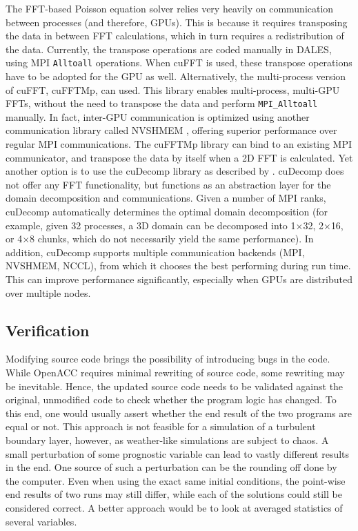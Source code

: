 The FFT-based Poisson equation solver relies very heavily on communication between processes (and therefore, GPUs). This is because it requires transposing the data in between FFT calculations, which in turn requires a redistribution of the data. Currently, the transpose operations are coded manually in DALES, using MPI \texttt{Alltoall} operations. When cuFFT is used, these transpose operations have to be adopted for the GPU as well. Alternatively, the multi-process version of cuFFT, cuFFTMp, can used. This library enables multi-process, multi-GPU FFTs, without the need to transpose the data and perform \texttt{MPI\_Alltoall} manually. In fact, inter-GPU communication is optimized using another communication library called NVSHMEM \citep{nvidiadeveloperNVSHMEM}, offering superior performance over regular MPI communications. The cuFFTMp library can bind to an existing MPI communicator, and transpose the data by itself when a 2D FFT is calculated. Yet another option is to use the cuDecomp library as described by \citet{romeroDistributedmemorySimulationsTurbulent2022}. cuDecomp does not offer any FFT functionality, but functions as an abstraction layer for the domain decomposition and communications. Given a number of MPI ranks, cuDecomp automatically determines the optimal domain decomposition (for example, given 32 processes, a 3D domain can be decomposed into 1$\times$32, 2$\times$16, or 4$\times$8 chunks, which do not necessarily yield the same performance). In addition, cuDecomp supports multiple communication backends (MPI, NVSHMEM, NCCL), from which it chooses the best performing during run time. This can improve performance significantly, especially when GPUs are distributed over multiple nodes. 

\subsection{Verification}
Modifying source code brings the possibility of introducing bugs in the code. While OpenACC requires minimal rewriting of source code, some rewriting may be inevitable. Hence, the updated source code needs to be validated against the original, unmodified code to check whether the program logic has changed. To this end, one would usually assert whether the end result of the two programs are equal or not. This approach is not feasible for a simulation of a turbulent boundary layer, however, as weather-like simulations are subject to chaos. A small perturbation of some prognostic variable can lead to vastly different results in the end. One source of such a perturbation can be the rounding off done by the computer. Even when using the exact same initial conditions, the point-wise end results of two runs may still differ, while each of the solutions could still be considered correct. A better approach would be to look at averaged statistics of several variables. 


